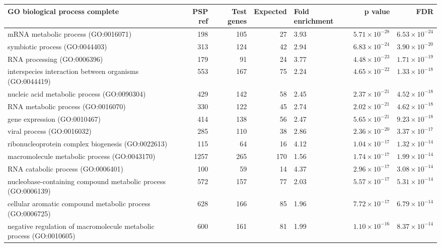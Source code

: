 \begin{table}[ht]
\centering
\begin{adjustbox}{width=\textwidth}


\begin{tabular}{lrrrlrr}
  \hline
GO biological process complete & PSP ref & Test genes & Expected & Fold enrichment & p value & FDR \\ 
  \hline
mRNA metabolic process (GO:0016071) & 198 & 105 & 27 & 3.93 & $5.71 \times 10^{-28}$ & $6.53 \times 10^{-24}$ \\ 
  symbiotic process (GO:0044403) & 313 & 124 & 42 & 2.94 & $6.83 \times 10^{-24}$ & $3.90 \times 10^{-20}$ \\ 
  RNA processing (GO:0006396) & 179 & 91 & 24 & 3.77 & $4.48 \times 10^{-23}$ & $1.71 \times 10^{-19}$ \\ 
  interspecies interaction between organisms (GO:0044419) & 553 & 167 & 75 & 2.24 & $4.65 \times 10^{-22}$ & $1.33 \times 10^{-18}$ \\ 
  nucleic acid metabolic process (GO:0090304) & 429 & 142 & 58 & 2.45 & $2.37 \times 10^{-21}$ & $4.52 \times 10^{-18}$ \\ 
  RNA metabolic process (GO:0016070) & 330 & 122 & 45 & 2.74 & $2.02 \times 10^{-21}$ & $4.62 \times 10^{-18}$ \\ 
  gene expression (GO:0010467) & 414 & 138 & 56 & 2.47 & $5.65 \times 10^{-21}$ & $9.23 \times 10^{-18}$ \\ 
  viral process (GO:0016032) & 285 & 110 & 38 & 2.86 & $2.36 \times 10^{-20}$ & $3.37 \times 10^{-17}$ \\ 
  ribonucleoprotein complex biogenesis (GO:0022613) & 115 & 64 & 16 & 4.12 & $1.04 \times 10^{-17}$ & $1.32 \times 10^{-14}$ \\ 
  macromolecule metabolic process (GO:0043170) & 1257 & 265 & 170 & 1.56 & $1.74 \times 10^{-17}$ & $1.99 \times 10^{-14}$ \\ 
  RNA catabolic process (GO:0006401) & 100 & 59 & 14 & 4.37 & $2.96 \times 10^{-17}$ & $3.08 \times 10^{-14}$ \\ 
  nucleobase-containing compound metabolic process (GO:0006139) & 572 & 157 & 77 & 2.03 & $5.57 \times 10^{-17}$ & $5.31 \times 10^{-14}$ \\ 
  cellular aromatic compound metabolic process (GO:0006725) & 628 & 166 & 85 & 1.96 & $7.72 \times 10^{-17}$ & $6.79 \times 10^{-14}$ \\ 
  negative regulation of macromolecule metabolic process (GO:0010605) & 600 & 161 & 81 & 1.99 & $1.10 \times 10^{-16}$ & $8.37 \times 10^{-14}$ \\ 

\end{tabular}
\end{adjustbox}
\end{table}

